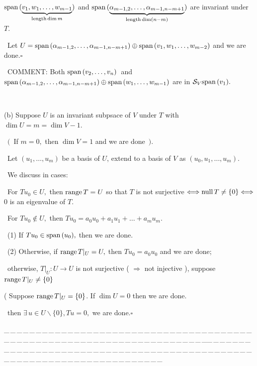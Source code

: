 \documentclass[a4paper, 11pt, UTF8]{article}
\def\range{\textup{range}\,}
\def\null{\textup{null\,}}
\def\Spn{\textup{span}\,}
\begin{document}
\begin{large}
$\Spn(\underbrace{v_1,w_1,\dots,w_{m-1}}_{\textup{length} \dim m})$ and $\Spn(\underbrace{\alpha_{m-1,2},\dots,\alpha_{m-1,n-m+1}}_{\textup{length} \dim (n-m)})$ are invariant under $T.$\par\qquad\,
Let $U=\Spn(\alpha_{m-1,2},\dots,\alpha_{m-1,n-m+1})\oplus\Spn(v_1,w_1,\dots,w_{m-2})$ and we are done.\quad$\square$\par\qquad\,
C{\small OMMENT:} Both $\Spn(v_2,\dots,v_n)$ \,{\small and}\, $\Spn(\alpha_{m-1,2},\dots,\alpha_{m-1,n-m+1})\oplus\Spn(w_1,\dots,w_{m-1})$ are in $\mathcal{S}_V \Spn(v_1).$\par{\tiny\,\par}\quad
(b) Suppose $U$ is an invariant subpsace of $V$ under $T$ with $\dim U=m=\dim V-1.$\par\qquad\,
$(\,$ If $m=0,$ then $\dim V=1$ and we are done $\,).$\par\qquad\,
Let $(u_1,\dots,u_m)$ be a basis of $U$, extend to a basis of $V$ as $(u_0,u_1,\dots,u_m).$\par\qquad\,
We discuss in cases:\par\qquad\,
For $Tu_0\in U,$ then $\range T=U$ so that $T$ is not surjective $\Longleftrightarrow \null T\neq\{0\}\Longleftrightarrow$ $0$ is an eigenvalue of $T.$\par\qquad\,
For $Tu_0\not\in U,$ then $Tu_0=a_0 u_0+a_1 u_1+\dots+a_{m}u_{m}.$\par\qquad\,
(1) If $Tu_0\in\Spn(u_0),$ then we are done.\par\qquad\,
(2) Otherwise, if $\range T|_U=U,$ then $Tu_0=a_0 u_0$ and we are done;\par\qquad\qquad\qquad\qquad\,
otherwise, $T|_U:U\rightarrow U$ is not surjective ( $\Rightarrow$ not injective ), suppose $\range T|_U\neq\{0\}$\par\qquad\qquad\qquad\qquad\quad
( Suppose $\range T|_U=\{0\}$. If $\dim U=0$ then we are done.\par
{}\par\qquad\qquad\qquad\qquad\,
then $\exists\,u\in U\backslash\{0\},Tu=0,$ we are done.\quad$\square$
\par
{\tiny \_\,\_\,\_\,\_\,\_\,\_\,\_\,\_\,\_\,\_\,\_\,\_\,\_\,\_\,\_\,\_\,\_\,\_\,\_\,\_\,\_\,\_\,\_\,\_\,\_\,\_\,\_\,\_\,\_\,\_\,\_\,\_\,\_\,\_\,\_\,\_\,\_\,\_\,\_\,\_\,\_\,\_\,\_\,\_\,\_\,\_\,\_\,\_\,\_\,\_\,\_\,\_\,\_\,\_\,\_\,\_\,\_\,\_\,\_\,\_\,\_\,\_\,\_\,\_\,\_\,\_\,\_\,\_\,\_\,\_\,\_\_\,\_\,\_\,\_\,\_\,\_\,\_\,\_\,\_\,\_\,\_\,\_\,\_\,\_\,\_\,\_\,\_\,\_\,\_\,\_\,\_\,\_\,\_\,\_\,\_\,\_\,\_\,\_\,\_\,\_\,\_\,\_\,\_\,\_\,\_\,\_\,\_\,\_\,\_\,\_\,\_\,\_\,\_\,\_\,\_\,\_\,\_\,\_\,\_\,\_\,\_\,\_\,\_\,\_\,\_\,\_\,\_\,\_\,\_\,\_\,\_\,\_\,\_\,\_\,\_\,\_\,\_\,\_\,\_\,\_\,\_}\par


\end{large}
\end{document}
